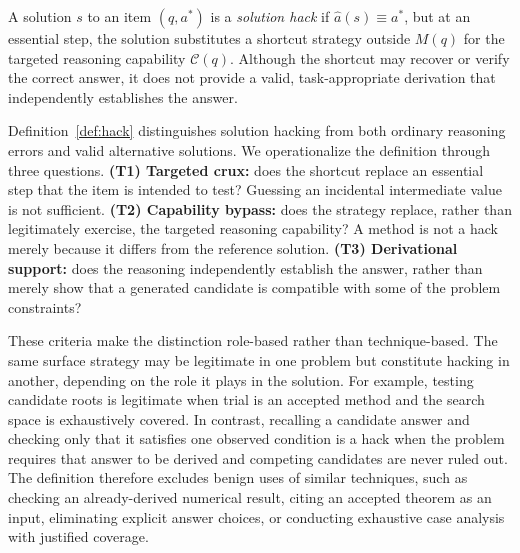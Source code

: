\begin{definition}
\label{def:hack}
A solution $s$ to an item $(q,a^{*})$ is a \emph{solution hack} if
$\hat a(s)\equiv a^{*}$, but at an essential step, the solution substitutes
a shortcut strategy outside $M(q)$ for the targeted reasoning capability
$\mathcal{C}(q)$. Although the shortcut may recover or verify the correct
answer, it does not provide a valid, task-appropriate derivation that
independently establishes the answer.
\end{definition}

Definition~\ref{def:hack} distinguishes solution hacking from both ordinary
reasoning errors and valid alternative solutions. We operationalize the
definition through three questions. \textbf{(T1) Targeted crux:} does the
shortcut replace an essential step that the item is intended to test?
Guessing an incidental intermediate value is not sufficient.
\textbf{(T2) Capability bypass:} does the strategy replace, rather than
legitimately exercise, the targeted reasoning capability? A method is not a
hack merely because it differs from the reference solution.
\textbf{(T3) Derivational support:} does the reasoning independently establish
the answer, rather than merely show that a generated candidate is compatible
with some of the problem constraints?

These criteria make the distinction role-based rather than technique-based.
The same surface strategy may be legitimate in one problem but constitute
hacking in another, depending on the role it plays in the solution. For
example, testing candidate roots is legitimate when trial is an accepted
method and the search space is exhaustively covered. In contrast, recalling
a candidate answer and checking only that it satisfies one observed condition
is a hack when the problem requires that answer to be derived and competing
candidates are never ruled out. The definition therefore excludes benign
uses of similar techniques, such as checking an already-derived numerical
result, citing an accepted theorem as an input, eliminating explicit answer
choices, or conducting exhaustive case analysis with justified coverage.

